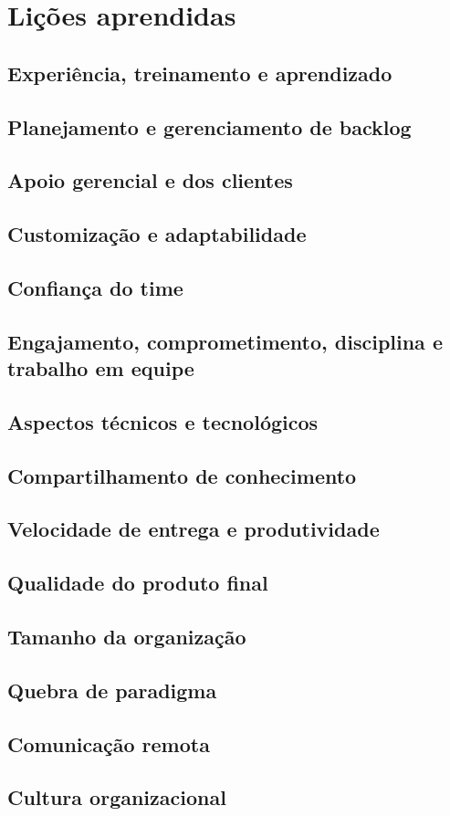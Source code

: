 	\section{Lições aprendidas}
		\subsection{Experiência, treinamento e aprendizado}
		\subsection{Planejamento e gerenciamento de backlog}
		\subsection{Apoio gerencial e dos clientes}
		\subsection{Customização e adaptabilidade}
		\subsection{Confiança do time}
		\subsection{Engajamento, comprometimento, disciplina e trabalho em equipe}
		\subsection{Aspectos técnicos e tecnológicos}
		\subsection{Compartilhamento de conhecimento}
		\subsection{Velocidade de entrega e produtividade}
		\subsection{Qualidade do produto final}
		\subsection{Tamanho da organização}
		\subsection{Quebra de paradigma}
		\subsection{Comunicação remota}
		\subsection{Cultura organizacional}